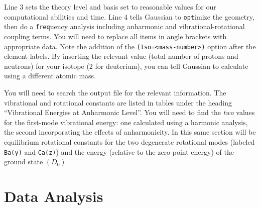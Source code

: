 \documentclass[nobib,nofonts,nols,nohyper]{tufte-handout}
\begin{document}
%
Line 3 sets the theory level and basis set to reasonable values for our computational abilities and time. 
Line 4 tells Gaussian to \Verb|opt|imize the geometry, then do a \Verb|freq|uency analysis including anharmonic and vibrational-rotational coupling terms. 
You will need to replace all items in angle brackets  with appropriate data.
Note the addition of the \lstinline`(Iso=<mass-number>)` option after the element labels. 
By inserting the relevant value (total number of protons and neutrons) for your isotope (\num{2} for deuterium), you can tell Gaussian to calculate using a different atomic mass. 

You will need to search the output file for the relevant information. 
The vibrational and rotational constants are listed in tables under the heading ``Vibrational Energies at Anharmonic Level''. 
You will need to find the \emph{two} values for the first-mode vibrational energy: one calculated using a harmonic analysis, the second incorporating the effects of anharmonicity. 
In this same section will be equilibrium rotational constants for the two degenerate rotational modes (labeled \Verb|Ba(y)| and \Verb|Ca(z)|) and the energy (relative to the zero-point energy) of the ground state \( (D_0) \).



\section{Data Analysis} %
\label{sec:data_analysis}
\end{document}
